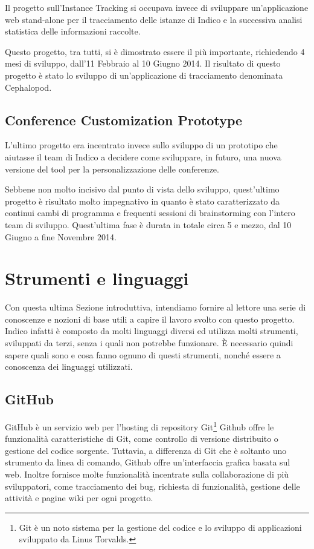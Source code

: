         	Il progetto sull'Instance Tracking si occupava invece di sviluppare un'applicazione web stand-alone per il tracciamento delle istanze di Indico e la successiva analisi statistica delle informazioni raccolte.
        	
        	Questo progetto, tra tutti, si è dimostrato essere il più importante, richiedendo 4 mesi di sviluppo, dall'11 Febbraio al 10 Giugno 2014. Il risultato di questo progetto è stato lo sviluppo di un'applicazione di tracciamento denominata Cephalopod.
    	
    	\subsection{Conference Customization Prototype} \label{subsec:p;pp;conference_customization_prototype}
    	
        	L'ultimo progetto era incentrato invece sullo sviluppo di un prototipo che aiutasse il team di Indico a decidere come sviluppare, in futuro, una nuova versione del tool per la personalizzazione delle conferenze.
        	
        	Sebbene non molto incisivo dal punto di vista dello sviluppo, quest'ultimo progetto è risultato molto impegnativo in quanto è stato caratterizzato da continui cambi di programma e frequenti sessioni di brainstorming con l'intero team di sviluppo. Quest'ultima fase è durata in totale circa 5 e mezzo, dal 10 Giugno a fine Novembre 2014.
    	
    \section{Strumenti e linguaggi} \label{sec:p;strumenti_linguaggi}
    
        Con questa ultima Sezione introduttiva, intendiamo fornire al lettore una serie di conoscenze e nozioni di base utili a capire il lavoro svolto con questo progetto. Indico infatti è composto da molti linguaggi diversi ed utilizza molti strumenti, sviluppati da terzi, senza i quali non potrebbe funzionare. È necessario quindi sapere quali sono e cosa fanno ognuno di questi strumenti, nonché essere a conoscenza dei linguaggi utilizzati.
        
        \subsection{GitHub} \label{subsec:p;sl;github}
        
            GitHub è un servizio web per l'hosting di repository Git\footnote{Git è un noto sistema per la gestione del codice e lo sviluppo di applicazioni sviluppato da Linus Torvalds.} Github offre le funzionalità caratteristiche di Git, come controllo di versione distribuito o gestione del codice sorgente. Tuttavia, a differenza di Git che è soltanto uno strumento da linea di comando, Github offre un'interfaccia grafica basata sul web. Inoltre fornisce molte funzionalità incentrate sulla collaborazione di più sviluppatori, come tracciamento dei bug, richiesta di funzionalità, gestione delle attività e pagine wiki per ogni progetto.
            
